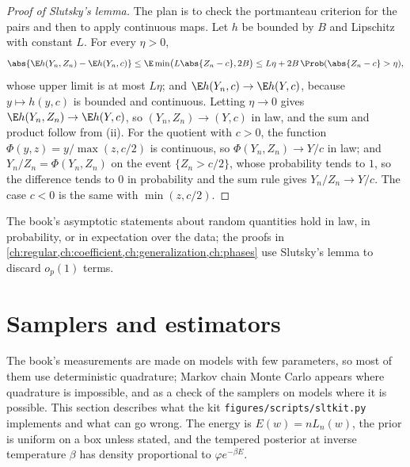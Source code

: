 \begin{refsection}
\begin{proof}[Proof of Slutsky's lemma]
The plan is to check the portmanteau criterion for the pairs and then to apply continuous maps. Let $h$ be bounded by $B$ and Lipschitz with constant $L$. For every $\eta>0$,
\[
\abs{\E h(Y_n,Z_n)-\E h(Y_n,c)}\le\E\min\bigl(L\abs{Z_n-c},2B\bigr)\le L\eta+2B\,\Prob(\abs{Z_n-c}>\eta),
\]
whose upper limit is at most $L\eta$; and $\E h(Y_n,c)\to\E h(Y,c)$, because $y\mapsto h(y,c)$ is bounded and continuous. Letting $\eta\to0$ gives $\E h(Y_n,Z_n)\to\E h(Y,c)$, so $(Y_n,Z_n)\to(Y,c)$ in law, and the sum and product follow from (ii). For the quotient with $c>0$, the function $\Phi(y,z)=y/\max(z,c/2)$ is continuous, so $\Phi(Y_n,Z_n)\to Y/c$ in law; and $Y_n/Z_n=\Phi(Y_n,Z_n)$ on the event $\{Z_n>c/2\}$, whose probability tends to $1$, so the difference tends to $0$ in probability and the sum rule gives $Y_n/Z_n\to Y/c$. The case $c<0$ is the same with $\min(z,c/2)$.
\end{proof}

The book's asymptotic statements about random quantities hold in law, in probability, or in expectation over the data; the proofs in \cref{ch:regular,ch:coefficient,ch:generalization,ch:phases} use Slutsky's lemma to discard $o_p(1)$ terms.

\section{Samplers and estimators}\label{sec:toolkit:mcmc}

The book's measurements are made on models with few parameters, so most of them use deterministic quadrature; Markov chain Monte Carlo appears where quadrature is impossible, and as a check of the samplers on models where it is possible. This section describes what the kit \texttt{figures/\allowbreak scripts/\allowbreak sltkit.py} implements and what can go wrong. The energy is $E(w)=nL_n(w)$, the prior is uniform on a box unless stated, and the tempered posterior at inverse temperature $\beta$ has density proportional to $\varphi e^{-\beta E}$.


\end{refsection}
